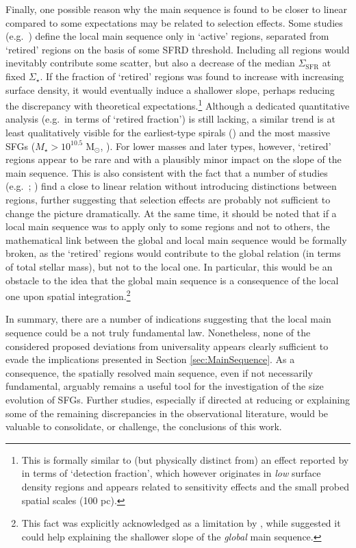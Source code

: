 \documentclass[fleqn,usenatbib]{mnras}
\begin{document}
Finally, one possible reason why the main sequence is found to be closer to linear compared to some expectations may be related to selection effects. Some studies (e.g.\ \citealt{Cano-Diaz+19}) define the local main sequence only in `active' regions, separated from `retired' regions on the basis of some SFRD threshold. Including all regions would inevitably contribute some scatter, but also a decrease of the median $\Sigma_\textrm{SFR}$ at fixed $\Sigma_\star$. If the fraction of `retired' regions was found to increase with increasing surface density, it would eventually induce a shallower slope, perhaps reducing the discrepancy with theoretical expectations.\footnote{This is formally similar to (but physically distinct from) an effect reported by \cite{Pessa+21} in terms of `detection fraction', which however originates in \emph{low} surface density regions and appears related to sensitivity effects and the small probed spatial scales (100 pc).} Although a dedicated quantitative analysis (e.g.\ in terms of `retired fraction') is still lacking, a similar trend is at least qualitatively visible for the earliest-type spirals (\citealt{Medling+18}) and the most massive SFGs ($M_\star > 10^{10.5} \; \textrm{M}_\odot$, \citealt{Wang+19}). For lower masses and later types, however, `retired' regions appear to be rare and with a plausibly minor impact on the slope of the main sequence. This is also consistent with the fact that a number of studies (e.g.\ \citealt{Hall+18}; \citealt{Enia+20}) find a close to linear relation without introducing distinctions between regions, further suggesting that selection effects are probably not sufficient to change the picture dramatically. At the same time, it should be noted that if a local main sequence was to apply only to some regions and not to others, the mathematical link between the global and local main sequence would be formally broken, as the `retired' regions would contribute to the global relation (in terms of total stellar mass), but not to the local one. In particular, this would be an obstacle to the idea that the global main sequence is a consequence of the local one upon spatial integration.\footnote{This fact was explicitly acknowledged as a limitation by \cite{Cano-Diaz+16}, while \cite{Sanchez2020} suggested it could help explaining the shallower slope of the \emph{global} main sequence.}

In summary, there are a number of indications suggesting that the local main sequence could be a not truly fundamental law. Nonetheless, none of the considered proposed deviations from universality appears clearly sufficient to evade the implications presented in Section \ref{sec:MainSequence}. As a consequence, the spatially resolved main sequence, even if not necessarily fundamental, arguably remains a useful tool for the investigation of the size evolution of SFGs. Further studies, especially if directed at reducing or explaining some of the remaining discrepancies in the observational literature, would be valuable to consolidate, or challenge, the conclusions of this work.
\end{document}
